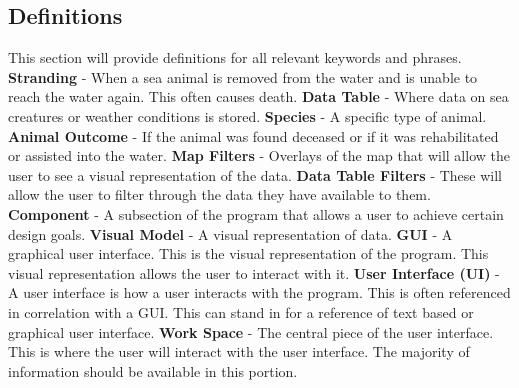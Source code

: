 \documentclass[onecolumn, draftclsnofoot,10pt, compsoc]{IEEEtran}
\begin{document}
\begin{singlespace}
\section{Definitions}
    This section will provide definitions for all relevant keywords and phrases. \newline \newline
    \textbf{Stranding} - When a sea animal is removed from the water and is unable to reach the water again. This often causes death. \newline \newline
    \textbf{Data Table} - Where data on sea creatures or weather conditions is stored. \newline \newline
    \textbf{Species} - A specific type of animal. \newline \newline
    \textbf{Animal Outcome} - If the animal was found deceased or if it was rehabilitated or assisted into the water. \newline \newline
    \textbf{Map Filters} - Overlays of the map that will allow the user to see a visual representation of the data. \newline \newline
    \textbf{Data Table Filters} - These will allow the user to filter through the data they have available to them.
    \textbf{Component} - A subsection of the program that allows a user to achieve certain design goals. \newline \newline
    \textbf{Visual Model} - A visual representation of data. \newline \newline
    \textbf{GUI} - A graphical user interface. This is the visual representation of the program. This visual representation allows the user to interact with it. \newline \newline
    \textbf{User Interface (UI)} - A user interface is how a user interacts with the program. This is often referenced in correlation with a GUI. This can stand in for a reference of text based or graphical user interface. \newline \newline
    \textbf{Work Space} - The central piece of the user interface. This is where the user will interact with the user interface. The majority of information should be available in this portion. \newline \newline

\end{singlespace}
\end{document}
